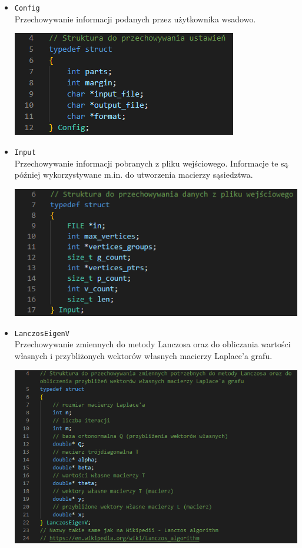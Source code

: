 \documentclass{article}
\begin{document}
    \begin{itemize}
    
        \item \texttt{Config} \\
        Przechowywanie informacji podanych przez użytkownika wsadowo.
    
        \includegraphics[width=0.65\linewidth, center]{img/config.png}
    
        \item \texttt{Input} \\
        Przechowywanie informacji pobranych z pliku wejściowego. Informacje te są później wykorzystywane m.in. do utworzenia macierzy sąsiedztwa.
    
        \includegraphics[width=0.75\linewidth, center]{img/input.png}

        \item \texttt{LanczosEigenV} \\
        Przechowywanie zmiennych do metody Lanczosa oraz do obliczania wartości własnych i przybliżonych wektorów własnych macierzy Laplace'a grafu.
    
        \includegraphics[width=0.825\linewidth, center]{img/lanczoseigenv.png}
    
    \end{itemize}
\end{document}
